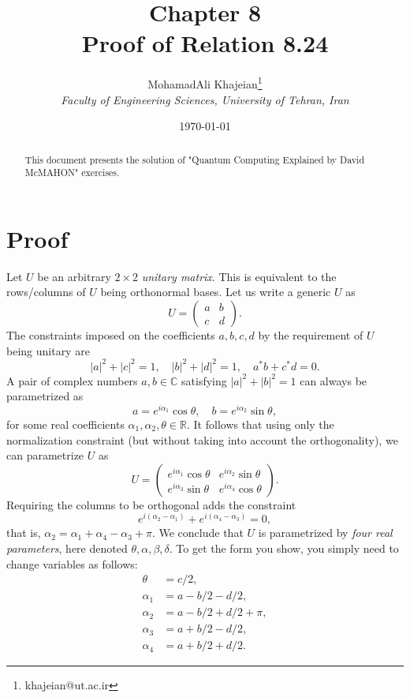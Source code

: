 \documentclass{article}
\title{\textbf{Chapter 8} \\ \small Proof of Relation 8.24}
\author{
    MohamadAli Khajeian\footnote{khajeian@ut.ac.ir} \\ 
    \small \textit{Faculty of Engineering Sciences, University of Tehran, Iran} \\ 
}
\date{\today}
\begin{document}
\maketitle

\begin{abstract}
    This document presents the solution of "Quantum Computing Explained by David McMAHON" exercises.
\end{abstract}

\section*{Proof}
Let \( U \) be an arbitrary \( 2 \times 2 \) \emph{unitary matrix}. This is equivalent to the rows/columns of \( U \) being orthonormal bases.
Let us write a generic \( U \) as
\[
U =
\begin{pmatrix}
a & b \\
c & d
\end{pmatrix}.
\]
The constraints imposed on the coefficients \( a, b, c, d \) by the requirement of \( U \) being unitary are
\[
|a|^2 + |c|^2 = 1, \quad |b|^2 + |d|^2 = 1, \quad a^*b + c^*d = 0.
\]
A pair of complex numbers \( a, b \in \mathbb{C} \) satisfying \( |a|^2 + |b|^2 = 1 \) can always be parametrized as
\[
a = e^{i\alpha_1} \cos\theta, \quad b = e^{i\alpha_2} \sin\theta,
\]
for some real coefficients \( \alpha_1, \alpha_2, \theta \in \mathbb{R} \). It follows that using only the normalization constraint (but without taking into account the orthogonality), we can parametrize \( U \) as
\[
U =
\begin{pmatrix}
e^{i\alpha_1} \cos\theta & e^{i\alpha_2} \sin\theta \\[0.8em]
e^{i\alpha_3} \sin\theta & e^{i\alpha_4} \cos\theta
\end{pmatrix}.
\]
Requiring the columns to be orthogonal adds the constraint
\[
e^{i(\alpha_2 - \alpha_1)} + e^{i(\alpha_4 - \alpha_3)} = 0,
\]
that is, \( \alpha_2 = \alpha_1 + \alpha_4 - \alpha_3 + \pi \). We conclude that \( U \) is parametrized by \emph{four real parameters}, here denoted \( \theta, \alpha, \beta, \delta \). To get the form you show, you simply need to change variables as follows:
\[
\begin{aligned}
\theta &= c / 2, \\
\alpha_1 &= a - b/2 - d/2, \\
\alpha_2 &= a - b/2 + d/2 + \pi, \\
\alpha_3 &= a + b/2 - d/2, \\
\alpha_4 &= a + b/2 + d/2.
\end{aligned}
\]
\end{document}
